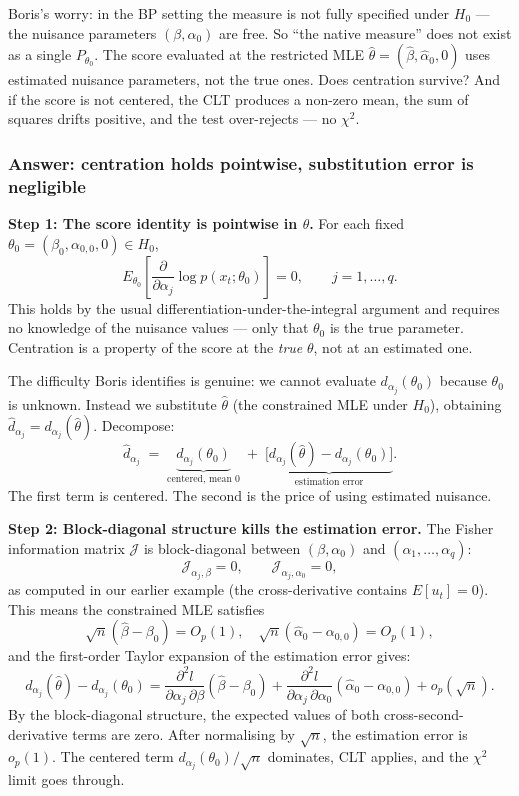 \documentclass[a4paper,oneside,12pt]{extarticle}
\theoremstyle{plain}
\theoremstyle{definition}
\theoremstyle{remark}
\begin{document}
Boris's worry: in the BP setting the measure is not fully specified
under $H_0$ — the nuisance parameters $(\beta, \alpha_0)$ are free.
So ``the native measure'' does not exist as a single $P_{\theta_0}$.
The score evaluated at the restricted MLE
$\hat\theta = (\hat\beta, \hat\alpha_0, 0)$ uses estimated nuisance
parameters, not the true ones.  Does centration survive?  And if the
score is not centered, the CLT produces a non-zero mean, the sum of
squares drifts positive, and the test over-rejects — no $\chi^2$.

\subsubsection*{Answer: centration holds pointwise, substitution error is negligible}

\textbf{Step 1: The score identity is pointwise in $\theta$.}
For each fixed $\theta_0 = (\beta_0, \alpha_{0,0}, 0) \in H_0$,
\[
  E_{\theta_0}\!\left[\frac{\partial}{\partial\alpha_j}\log p(x_t;\theta_0)\right] = 0,
  \qquad j = 1,\ldots,q.
\]
This holds by the usual differentiation-under-the-integral argument
and requires no knowledge of the nuisance values — only that $\theta_0$
is the true parameter.  Centration is a property of the score at the
\emph{true} $\theta$, not at an estimated one.

The difficulty Boris identifies is genuine: we cannot evaluate
$d_{\alpha_j}(\theta_0)$ because $\theta_0$ is unknown.  Instead we
substitute $\hat\theta$ (the constrained MLE under $H_0$), obtaining
$\hat d_{\alpha_j} = d_{\alpha_j}(\hat\theta)$.  Decompose:
\[
  \hat d_{\alpha_j}
  \;=\;
  \underbrace{d_{\alpha_j}(\theta_0)}_{\text{centered, mean 0}}
  \;+\;
  \underbrace{\bigl[d_{\alpha_j}(\hat\theta) - d_{\alpha_j}(\theta_0)\bigr]}_{\text{estimation error}}.
\]
The first term is centered.  The second is the price of using estimated
nuisance.

\textbf{Step 2: Block-diagonal structure kills the estimation error.}
The Fisher information matrix $\mathcal{J}$ is block-diagonal between
$(\beta, \alpha_0)$ and $(\alpha_1,\ldots,\alpha_q)$:
\[
  \mathcal{J}_{\alpha_j,\beta} = 0,
  \qquad
  \mathcal{J}_{\alpha_j,\alpha_0} = 0,
\]
as computed in our earlier example (the cross-derivative contains
$E[u_t] = 0$).  This means the constrained MLE satisfies
\[
  \sqrt{n}(\hat\beta - \beta_0) = O_p(1), \quad
  \sqrt{n}(\hat\alpha_0 - \alpha_{0,0}) = O_p(1),
\]
and the first-order Taylor expansion of the estimation error gives:
\[
  d_{\alpha_j}(\hat\theta) - d_{\alpha_j}(\theta_0)
  = \frac{\partial^2 l}{\partial\alpha_j\,\partial\beta}(\hat\beta-\beta_0)
  + \frac{\partial^2 l}{\partial\alpha_j\,\partial\alpha_0}(\hat\alpha_0-\alpha_{0,0})
  + o_p(\sqrt{n}).
\]
By the block-diagonal structure, the expected values of both
cross-second-derivative terms are zero.  After normalising by
$\sqrt{n}$, the estimation error is $o_p(1)$.  The centered term
$d_{\alpha_j}(\theta_0)/\sqrt{n}$ dominates, CLT applies, and the
$\chi^2$ limit goes through.
\end{document}
